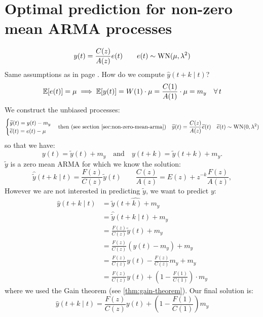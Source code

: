 \section{Optimal prediction for non-zero mean ARMA processes}
\[
	y(t)=\frac{C(z)}{A(z)}e(t)\qquad e(t)\sim \operatorname{WN}(\mu,\lambda^2 )
\]
Same assumptions as in page \pageref{assumptions-prediction-theory}. How do we compute $\hat y(t+k\mid t)$?
\[
	\E[e(t)] = \mu \implies \E[y(t)]=W(1)\cdot\mu=\frac{C(1)}{A(1)}\cdot\mu=m_{y} \quad \forall t
\]
We construct the unbiased processes:
\[
	\begin{cases}
		\tilde y(t)=y(t)-m_{y}\\
		\tilde e(t)=e(t)-\mu
	\end{cases}
	\text{then (see section \ref{sec:non-zero-mean-arma})}
	\quad
	\tilde y(t)=\frac{C(z)}{A(z)}\tilde e(t) \quad \tilde e(t)\sim \WN(0,\lambda^2)
\]
so that we have:
\[
	y(t)=\tilde y(t)+m_{y} \quad\text{and}\quad y(t+k)=\tilde y(t+k)+m_{y}.
\]
$\tilde y$ is a zero mean ARMA for which we know the solution:
\[
	\hat{\tilde y} (t+k\mid t) = \frac{F(z)}{C(z)}\tilde y(t) \qquad \frac{C(z)}{A(z)}=E(z)+z^{-k}\frac{F(z) }{A(z)},
\]
However we are not interested in predicting $\tilde y$, we want to predict $y$:
\begin{align*}
	\hat y(t+k\mid t)&=\widehat{\tilde y(t+k)+m_{y}}\\
	&= \hat{\tilde y}(t+k\mid t)+m_{y}\\
	&=\frac{F(z)}{C(z)}\tilde y(t)+m_{y}\\
	&=\frac{F(z)}{C(z)}(y(t)-m_{y})+m_{y}\\
	&=\frac{F(z)}{C(z)}y(t)-\frac{F(z)}{C(z)}m_{y}+m_{y}\\
	&=\frac{F(z)}{C(z)}y(t)+\left( 1-\frac{F(1)}{C(1)} \right)  \cdot m_{y}
\end{align*}
where we used the Gain theorem (see \ref{thm:gain-theorem}). Our final solution is:
\[
	\boxed{\hat y(t+k\mid t) = \frac{F(z)}{C(z)}y(t)+\left( 1-\frac{F(1)}{C(1)} \right) m_{y}}
\]